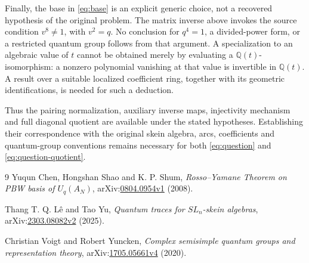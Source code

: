 \documentclass[11pt]{article}
\theoremstyle{definition}
\theoremstyle{remark}
\newcommand{\Q}{\mathbb{Q}}
\begin{document}
Finally, the base in \eqref{eq:base} is an explicit generic choice, not a recovered hypothesis of the original problem. The matrix inverse above invokes the source condition $v^8\ne1$, with $v^2=q$. No conclusion for $q^4=1$, a divided-power form, or a restricted quantum group follows from that argument. A specialization to an algebraic value of $t$ cannot be obtained merely by evaluating a $\Q(t)$-isomorphism: a nonzero polynomial vanishing at that value is invertible in $\Q(t)$. A result over a suitable localized coefficient ring, together with its geometric identifications, is needed for such a deduction.

Thus the pairing normalization, auxiliary inverse maps, injectivity mechanism and full diagonal quotient are available under the stated hypotheses. Establishing their correspondence with the original skein algebra, arcs, coefficients and quantum-group conventions remains necessary for both \eqref{eq:question} and \eqref{eq:question-quotient}.

\begin{thebibliography}{9}
Yuqun Chen, Hongshan Shao and K. P. Shum,
\emph{Rosso--Yamane Theorem on PBW basis of $U_q(A_N)$},
arXiv:\href{https://arxiv.org/abs/0804.0954v1}{0804.0954v1} (2008).

Thang T. Q. L\^e and Tao Yu,
\emph{Quantum traces for $SL_n$-skein algebras},
arXiv:\href{https://arxiv.org/abs/2303.08082v2}{2303.08082v2} (2025).

Christian Voigt and Robert Yuncken,
\emph{Complex semisimple quantum groups and representation theory},
arXiv:\href{https://arxiv.org/abs/1705.05661v4}{1705.05661v4} (2020).
\end{thebibliography}
\end{document}
